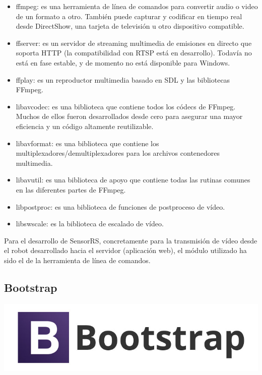 \begin{itemize}
 \item ffmpeg: es una herramienta de línea de comandos para convertir audio o video de un formato a otro. También puede capturar y codificar en tiempo real desde DirectShow, una tarjeta de televisión u otro dispositivo compatible.
 \item ffserver: es un servidor de streaming multimedia de emisiones en directo que soporta HTTP (la compatibilidad con RTSP está en desarrollo). Todavía no está en fase estable, y de momento no está disponible para Windows.
 \item ffplay: es un reproductor multimedia basado en SDL y las bibliotecas FFmpeg.
 \item libavcodec: es una biblioteca que contiene todos los códecs de FFmpeg. Muchos de ellos fueron desarrollados desde cero para asegurar una mayor eficiencia y un código altamente reutilizable.
 \item libavformat: es una biblioteca que contiene los multiplexadores/demultiplexadores para los archivos contenedores multimedia.
 \item libavutil: es una biblioteca de apoyo que contiene todas las rutinas comunes en las diferentes partes de FFmpeg.
 \item libpostproc: es una biblioteca de funciones de postproceso de vídeo.
 \item libswscale: es la biblioteca de escalado de vídeo.
\end{itemize}

Para el desarrollo de SensorRS, concretamente para la transmisión de vídeo desde el robot desarrollado hacia el servidor (aplicación web), el módulo utilizado ha sido el de la herramienta de línea de comandos.


\subsection{Bootstrap}


\begin{center}
\includegraphics[scale=0.3]{imagenes/bootstrap-logo.jpg}
\end{center}

